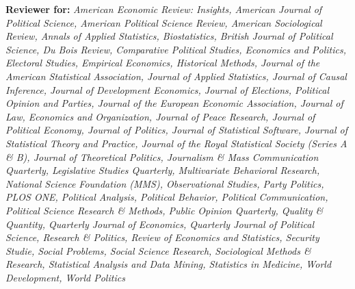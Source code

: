 \documentclass[11pt,article,oneside]{memoir}
\begin{document}
\begin{cvlist}
\item \textbf{Reviewer for:} \emph{American Economic Review: Insights, American Journal of Political Science, American Political Science Review, American Sociological Review, Annals of Applied Statistics,  Biostatistics, British Journal of Political Science, Du Bois Review, Comparative Political Studies, Economics and Politics, Electoral Studies, Empirical Economics, Historical Methods, Journal of the American Statistical Association, Journal of Applied Statistics, Journal of Causal Inference, Journal of Development Economics, Journal of Elections, Political Opinion and Parties, Journal of the European Economic Association, Journal of Law, Economics and Organization, Journal of Peace Research, Journal of Political Economy, Journal of Politics, Journal of Statistical Software, Journal of Statistical Theory and Practice, Journal of the Royal Statistical Society (Series A \& B), Journal of Theoretical Politics, Journalism \& Mass Communication Quarterly, Legislative Studies Quarterly, Multivariate Behavioral Research, National Science Foundation (MMS), Observational Studies, Party Politics, PLOS ONE, Political Analysis, Political Behavior, Political Communication, Political Science Research \& Methods, Public Opinion Quarterly, Quality \& Quantity, Quarterly Journal of Economics, Quarterly Journal of Political Science, Research \& Politics, Review of Economics and Statistics, Security Studie, Social Problems, Social Science Research, Sociological Methods \& Research,  Statistical Analysis and Data Mining, Statistics in Medicine, World Development, World Politics} 


\end{cvlist}
\end{document}
